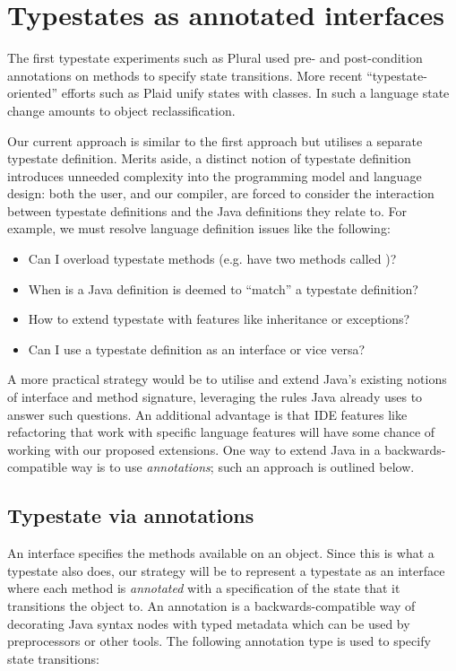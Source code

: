 \section{Typestates as annotated interfaces}

The first typestate experiments such as Plural \cite{bierhoff11} used
pre- and post-condition annotations on methods to specify state
transitions. More recent ``typestate-oriented'' efforts such as Plaid
\cite{garcia14} unify states with classes. In such a language state
change amounts to object reclassification.

Our current approach is similar to the first approach but utilises a
separate typestate definition. Merits aside, a distinct notion of
typestate definition introduces unneeded complexity into the
programming model and language design: both the user, and our
compiler, are forced to consider the interaction between typestate
definitions and the Java definitions they relate to. For example, we
must resolve language definition issues like the following:

\begin{itemize}
\item Can I overload typestate methods (e.g. have two methods called
  )?
\item When is a Java definition is deemed to ``match'' a typestate
  definition?
\item How to extend typestate with features like inheritance or exceptions?
\item Can I use a typestate definition as an interface or vice versa?
\end{itemize}

\noindent A more practical strategy would be to utilise and extend
Java's existing notions of interface and method signature, leveraging
the rules Java already uses to answer such questions. An additional
advantage is that IDE features like refactoring that work with
specific language features will have some chance of working with our
proposed extensions. One way to extend Java in a backwards-compatible
way is to use \emph{annotations}; such an approach is outlined below.

\subsection{Typestate via annotations}

An interface specifies the methods available on an object. Since this
is what a typestate also does, our strategy will be to represent a
typestate as an interface where each method is \emph{annotated} with a
specification of the state that it transitions the object to. An
annotation is a backwards-compatible way of decorating Java syntax
nodes with typed metadata which can be used by preprocessors or other
tools. The following annotation type  is used to specify
state transitions:

